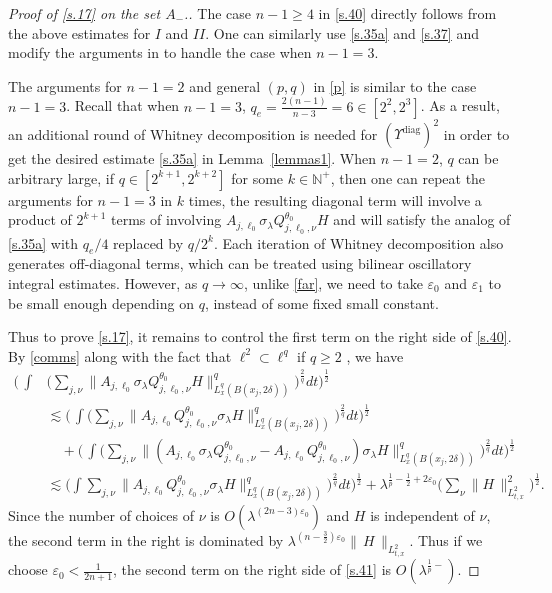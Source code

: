\documentclass[10pt]{amsart}
\newcommand{\la}{\lambda}
\newcommand{\e}{\varepsilon}
\newcommand{\1}{{\bf 1}}
\newcommand{\diag}{\Upsilon^{\text{diag}}}
\begin{document}
\begin{proof}[Proof of \eqref{s.17} on the set $A_-$.]
The case $n-1\ge 4$ in \eqref{s.40} directly follows from the above estimates for $I$ and $II$.
One can similarly use \eqref{s.35a} and \eqref{s.37} and
 modify the arguments in \cite{HSst}
to handle the case when $n-1=3$.


The arguments for $n-1=2$ and general $(p,q)$ in \eqref{p} is similar to the case $n-1=3$. Recall that when $n-1=3$, $q_e=\frac{2(n-1)}{n-3}=6\in [2^2, 2^3]$. As a result, an additional round of 
Whitney decomposition is needed for $(\diag)^2$ in order to get the desired estimate \eqref{s.35a} in Lemma~\ref{lemmas1}.  When $n-1=2$, $q$ can be arbitrary large, if $q\in [2^{k+1}, 2^{k+2}]$ for some $k\in \mathbb{N}^+$, then one can repeat the arguments for $n-1=3$ in \cite{HSst} $k$ times,  the resulting diagonal term will involve a product of $2^{k+1}$ terms of involving $A_{j,\ell_0}\sigma_\la Q^{\theta_0}_{j,\ell_0,\nu} H$ and will satisfy the analog of \eqref{s.35a} with $q_e/4$ replaced by $q/2^k$. Each iteration of 
Whitney decomposition also generates off-diagonal terms,
which can be treated using bilinear oscillatory integral estimates. However, as $q\rightarrow \infty$, unlike \eqref{far}, we need to take $\e_0$ and $\e_1$ to be small enough depending on $q$, instead of some fixed small constant.


Thus to prove \eqref{s.17}, it remains to control the first term on the right side of \eqref{s.40}.
By \eqref{comms} along with the fact that $\ell^{2}\subset \ell^{q}$ if $q\ge 2$ , we have 
\begin{equation}\label{s.41}
    \begin{aligned}
      \big(\,\int & \big(\sum_{j,\nu}\bigl\| A_{j,\ell_0}\sigma_\la Q^{\theta_0}_{j,\ell_0,\nu} H\bigr\|^{q}_{L^{q}_x(B(x_j,2\delta))}\big)^{\frac{2}{q}}dt\big)^{\frac12}
\\
&\lesssim    \big(\,\int  \big(\sum_{j,\nu}\bigl\| A_{j,\ell_0} Q^{\theta_0}_{j,\ell_0,\nu} \sigma_\la H\bigr\|^{q}_{L^{q}_x(B(x_j,2\delta))}\big)^{\frac{2}{q}}dt\big)^{\frac12} \\
&\quad+   \big(\,\int  \big(\sum_{j,\nu}\bigl\| (A_{j,\ell_0}\sigma_\la Q^{\theta_0}_{j,\ell_0,\nu}-A_{j,\ell_0} Q^{\theta_0}_{j,\ell_0,\nu}) \sigma_\la H\bigr\|^{q}_{L^{q}_x(B(x_j,2\delta))}\big)^{\frac{2}{q}}dt\big)^{\frac12}
\\
&\lesssim 
 \big(\int\sum_{j,\nu}\bigl\| A_{j,\ell_0} Q^{\theta_0}_{j,\ell_0,\nu}\sigma_\la H\bigr\|^{q}_{L^{q}_x(B(x_j,2\delta))}\big)^{\frac{2}{q}}dt\big)^{\frac12}+\la^{\frac1p-\frac12+2\e_0}\big( \sum_\nu \| H\,\|^2_{L^2_{t,x}}\big)^{\frac12} .
    \end{aligned}
\end{equation}
Since the number of choices of $\nu$ is $O(\la^{(2n-3)\e_0})$ and $H$ is independent of $\nu$, the second term in the right is dominated by $\la^{(n-\frac32)\e_0}\| \, 
H\,\|_{L^2_{t,x}}$. Thus if we choose $\e_0<\tfrac{1}{2n+1}$,  the second term on the right side of \eqref{s.41} is 
$O(\la^{\frac1{p}-})$.



\end{proof}
\end{document}
